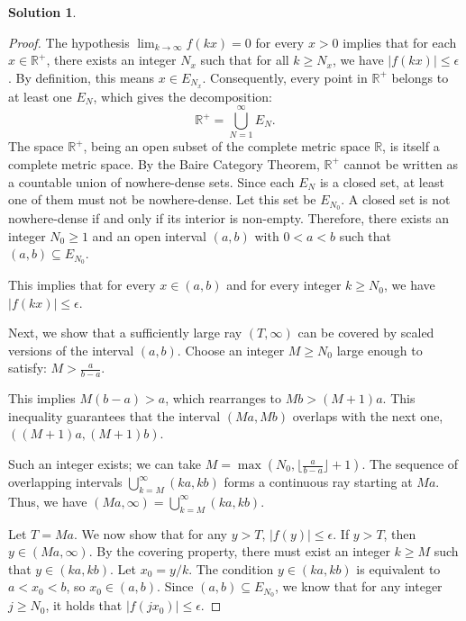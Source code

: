 \documentclass[12pt]{article}
\theoremstyle{definition}
\newtheorem*{solution}{\normalfont\textbf{Solution}}
\begin{document}
\begin{enumerate}[leftmargin=*]
\begin{solution}
\begin{proof}
                The hypothesis \( \lim_{k \to \infty} f(kx) = 0 \) for every \( x > 0 \) implies that for each \( x \in \mathbb{R}^+ \), there exists an integer \( N_x \) such that for all \( k \geq N_x \), we have \( |f(kx)| \leq \epsilon \). By definition, this means \( x \in E_{N_x} \). Consequently, every point in \( \mathbb{R}^+ \) belongs to at least one \( E_N \), which gives the decomposition:
                \[
                \mathbb{R}^+ = \bigcup_{N=1}^\infty E_N.
                \]
                The space \( \mathbb{R}^+ \), being an open subset of the complete metric space \( \mathbb{R} \), is itself a complete metric space. By the Baire Category Theorem, \( \mathbb{R}^+ \) cannot be written as a countable union of nowhere-dense sets. Since each \( E_N \) is a closed set, at least one of them must not be nowhere-dense. Let this set be \( E_{N_0} \). A closed set is not nowhere-dense if and only if its interior is non-empty. Therefore, there exists an integer \( N_0 \geq 1 \) and an open interval \( (a, b) \) with \( 0 < a < b \) such that \( (a, b) \subseteq E_{N_0} \).

                This implies that for every \( x \in (a, b) \) and for every integer \( k \geq N_0 \), we have \( |f(kx)| \leq \epsilon \).

                Next, we show that a sufficiently large ray \( (T, \infty) \) can be covered by scaled versions of the interval \( (a,b) \). Choose an integer \( M \geq N_0 \) large enough to satisfy:
                \( M > \frac{a}{b-a} \). 
                
                This implies \( M(b-a) > a \), which rearranges to \( Mb > (M+1)a \). This inequality guarantees that the interval \( (Ma, Mb) \) overlaps with the next one, \( ((M+1)a, (M+1)b) \).
               
                
                Such an integer exists; we can take \( M = \max(N_0, \lfloor \frac{a}{b-a} \rfloor + 1) \). The sequence of overlapping intervals \( \bigcup_{k=M}^{\infty} (ka, kb) \) forms a continuous ray starting at \( Ma \). Thus, we have \( (Ma, \infty) = \bigcup_{k=M}^{\infty} (ka, kb) \).

                Let \( T = Ma \). We now show that for any \( y > T \), \( |f(y)| \leq \epsilon \).
                If \( y > T \), then \( y \in (Ma, \infty) \). By the covering property, there must exist an integer \( k \geq M \) such that \( y \in (ka, kb) \).
                Let \( x_0 = y/k \). The condition \( y \in (ka, kb) \) is equivalent to \( a < x_0 < b \), so \( x_0 \in (a, b) \).
                Since \( (a, b) \subseteq E_{N_0} \), we know that for any integer \( j \geq N_0 \), it holds that \( |f(jx_0)| \leq \epsilon \).


\end{proof}
\end{solution}
\end{enumerate}
\end{document}
